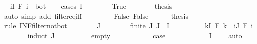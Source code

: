 \begin{isabellebody}
\ \isamarkupfalse%
\ {\isachardoublequoteopen}{\isacharparenleft}{\kern0pt}{\isasymSqinter}i{\isasymin}I{\isachardot}{\kern0pt}\ F\ i{\isacharparenright}{\kern0pt}\ {\isasymnoteq}\ bot{\isachardoublequoteclose}\isanewline
\ \ \isamarkupfalse%
\ {\isacharparenleft}{\kern0pt}cases\ {\isachardoublequoteopen}I\ {\isacharequal}{\kern0pt}\ {\isacharbraceleft}{\kern0pt}{\isacharbraceright}{\kern0pt}{\isachardoublequoteclose}{\isacharparenright}{\kern0pt}\isanewline
\ \ \ \ \isamarkupfalse%
\ True\isanewline
\ \ \ \ \isamarkupfalse%
\ \isamarkupfalse%
\ {\isacharquery}{\kern0pt}thesis\isanewline
\ \ \ \ \ \ \isamarkupfalse%
\ {\isacharparenleft}{\kern0pt}auto\ simp\ add{\isacharcolon}{\kern0pt}\ filter{\isacharunderscore}{\kern0pt}eq{\isacharunderscore}{\kern0pt}iff{\isacharparenright}{\kern0pt}\isanewline
\ \ \isamarkupfalse%
\isanewline
\ \ \ \ \isamarkupfalse%
\ False{\isacharprime}{\kern0pt}{\isacharcolon}{\kern0pt}\ False\isanewline
\ \ \ \ \isamarkupfalse%
\ {\isacharquery}{\kern0pt}thesis\isanewline
\ \ \ \ \isamarkupfalse%
\ {\isacharparenleft}{\kern0pt}rule\ INF{\isacharunderscore}{\kern0pt}filter{\isacharunderscore}{\kern0pt}not{\isacharunderscore}{\kern0pt}bot{\isacharparenright}{\kern0pt}\isanewline
\ \ \ \ \ \ \isamarkupfalse%
\ J\isanewline
\ \ \ \ \ \ \isamarkupfalse%
\ {\isachardoublequoteopen}finite\ J{\isachardoublequoteclose}\ {\isachardoublequoteopen}J\ {\isasymsubseteq}\ I{\isachardoublequoteclose}\isanewline
\ \ \ \ \ \ \isamarkupfalse%
\ \isamarkupfalse%
\ {\isachardoublequoteopen}{\isasymexists}k{\isasymin}I{\isachardot}{\kern0pt}\ F\ k\ {\isasymle}\ {\isacharparenleft}{\kern0pt}{\isasymSqinter}i{\isasymin}J{\isachardot}{\kern0pt}\ F\ i{\isacharparenright}{\kern0pt}{\isachardoublequoteclose}\isanewline
\ \ \ \ \ \ \isamarkupfalse%
\ {\isacharparenleft}{\kern0pt}induct\ J{\isacharparenright}{\kern0pt}\isanewline
\ \ \ \ \ \ \ \ \isamarkupfalse%
\ empty\isanewline
\ \ \ \ \ \ \ \ \isamarkupfalse%
\ \isamarkupfalse%
\ {\isacharquery}{\kern0pt}case\isanewline
\ \ \ \ \ \ \ \ \ \ \isamarkupfalse%
\ {\isacartoucheopen}I\ {\isasymnoteq}\ {\isacharbraceleft}{\kern0pt}{\isacharbraceright}{\kern0pt}{\isacartoucheclose}\ \isamarkupfalse%
\ auto\isanewline
\ \ \ \ \ \ \isamarkupfalse%
\isanewline
\ \ \ \ \ \ \ \ \isamarkupfalse%

\end{isabellebody}

